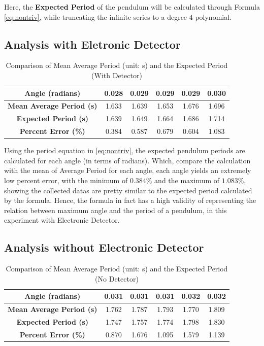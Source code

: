 \documentclass{article}
\begin{document}
Here, the \textbf{Expected Period} of the pendulum will be calculated through Formula \ref{eq:nontriv}, while truncating the infinite series to a degree $4$ polynomial.

\subsection{Analysis with Eletronic Detector}
\begin{table}[h!]
\centering
\begin{tabular}{c||c|c|c|c|c}
\toprule
\textbf{Angle (radians)} & 0.028 & 0.029 & 0.029 & 0.029 & 0.030 \\
\hline
\textbf{Mean Average Period (s)} & 1.633 & 1.639 & 1.653 & 1.676 & 1.696 \\
\hline
\textbf{Expected Period (s)} & 1.639 & 1.649 & 1.664 & 1.686 & 1.714 \\
\hline
\textbf{Percent Error (\%)} & 0.384 & 0.587 & 0.679 & 0.604 & 1.083 \\
\bottomrule
\end{tabular}
\caption{Comparison of Mean Average Period (unit: s) and the Expected Period (With Detector)}
\label{tab:compare_elect}
\end{table}

Using the period equation in \ref{eq:nontriv}, the expected pendulum periods are calculated for each angle (in terms of radians). Which, compare the calculation with the mean of Average Period for each angle, each angle yields an extremely low percent error, with the minimum of $0.384\%$ and the maximum of $1.083\%$, showing the collected datas are pretty similar to the expected period calculated by the formula. Hence, the formula in fact has a high validity of representing the relation between maximum angle and the period of a pendulum, in this experiment with Electronic Detector.

\hfil

\subsection{Analysis without Electronic Detector}
\begin{table}[h!]
\centering
\begin{tabular}{c||c|c|c|c|c}
\toprule
\textbf{Angle (radians)} & 0.031 & 0.031 & 0.031 & 0.032 & 0.032 \\
\hline
\textbf{Mean Average Period (s)} & 1.762 & 1.787 & 1.793 & 1.770 & 1.809 \\
\hline
\textbf{Expected Period (s)} & 1.747 & 1.757 & 1.774 & 1.798 & 1.830 \\
\hline
\textbf{Percent Error (\%)} & 0.870 & 1.676 & 1.095 & 1.579 & 1.139 \\
\bottomrule
\end{tabular}
\caption{Comparison of Mean Average Period (unit: s) and the Expected Period (No Detector)}
\label{tab:compare_noelect}
\end{table}
\end{document}

